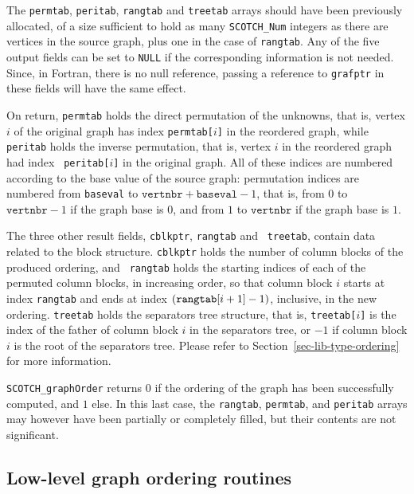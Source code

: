 \begin{itemize}
The {\tt permtab}, {\tt peritab}, {\tt rangtab} and {\tt treetab}
arrays should have been previously allocated, of a size sufficient to
hold as many {\tt SCOTCH\_\lbt Num} integers as there are vertices in
the source graph, plus one in the case of {\tt rangtab}. Any of the
five output fields can be set to {\tt NULL} if the corresponding
information is not needed. Since, in Fortran, there is no null
reference, passing a reference to {\tt grafptr} in these fields will
have the same effect.

On return, {\tt permtab} holds the direct permutation of the unknowns,
that is, vertex $i$ of the original graph has index {\tt permtab[$i$]}
in the reordered graph, while {\tt peritab} holds the inverse
permutation, that is, vertex $i$ in the reordered graph had index {\tt
peritab[$i$]} in the original graph. All of these indices are numbered
according to the base value of the source graph: permutation indices
are numbered from {\tt baseval} to
$\mathtt{vertnbr} + \mathtt{baseval} - 1$, that is,
from $0$ to $\mathtt{vertnbr} - 1$ if the graph base is
$0$, and from $1$ to $\mathtt{vertnbr}$ if the graph base is $1$.

The three other result fields, {\tt *cblkptr}, {\tt rangtab} and {\tt
treetab}, contain data related to the block structure. {\tt *cblkptr}
holds the number of column blocks of the produced ordering, and {\tt
rangtab} holds the starting indices of each of the permuted column
blocks, in increasing order, so that column block $i$ starts at index
{\tt rangtab\lbt [$i$]} and ends at index $(\mbox{\tt
rangtab}\lbt\mathtt{[}i + 1\mathtt{]} - 1)$, inclusive, in the new
ordering. {\tt treetab} holds the separators tree structure, that is,
{\tt treetab[$i$]} is the index of the father of column block $i$ in
the separators tree, or $-1$ if column block $i$ is the root of the
separators tree. Please refer to Section~\ref{sec-lib-type-ordering}
for more information.

\progret

{\tt SCOTCH\_graphOrder} returns $0$ if the ordering of the graph has
been successfully computed, and $1$ else. In this last case, the
{\tt rangtab}, {\tt permtab}, and {\tt peritab} arrays may however have
been partially or completely filled, but their contents are not significant.
\end{itemize}

\subsection{Low-level graph ordering routines}

